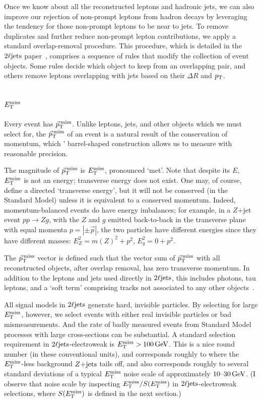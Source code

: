 Once we know about all the reconstructed leptons and hadronic jets, we can
also improve our rejection of non-prompt leptons from hadron decays by
leveraging the tendency for those non-prompt leptons to be near to jets.
To remove duplicates and further reduce non-prompt lepton contributions, we
apply a standard overlap-removal procedure.
This procedure, which is detailed in the $\twoljets$
paper~\cite{atlas2022searches},
comprises a sequence of rules that modify the collection of event objects.
Some rules decide which object to keep from an overlapping pair,
and others remove leptons overlapping with jets based on their $\Delta R$
and $\pt$.


\subsection{\texorpdfstring{$\met$}{ETmiss}}
Every event has $\ptmiss$.
Unlike leptons, jets, and other objects which we must select for, the $\ptmiss$
of an event is a natural result of the conservation of momentum, which \atlas'
barrel-shaped construction allows us to measure with reasonable precision.

The magnitude of $\ptmiss$ is $\met$, pronounced `met'.
Note that despite its $E$, $\met$ is not an energy; transverse energy does not exist.
One may, of course, define a directed `transverse energy', but it will
not be conserved (in the Standard Model) unless it is equivalent to a conserved
momentum.
Indeed, momentum-balanced events do have energy imbalances;
for example, in a $Z\mathrm{+jet}$ event $pp \to Zg$, with the $Z$ and
$g$ emitted back-to-back in the transverse plane with equal momenta
$p = |\pm \vec p|$, the two particles have different energies since they
have different masses: $E_Z^2 = m(Z)^2 + p^2$, $E_g^2 = 0 + p^2$.

The $\ptmiss$ vector is defined such that the vector sum of $\ptmiss$ with
all reconstructed objects, after overlap removal, has zero transverse momentum.
In addition to the leptons and jets used directly in $\twoljets$, this includes
photons, tau leptons, and a `soft term' comprising tracks not associated to
any other objects~\cite{atlas_met}.

All signal models in $\twoljets$ generate hard, invisible particles.
By selecting for large $\met$, however, we select events with either
real invisible particles or bad mismeasurements.
And the rate of badly measured events from Standard Model processes with large
cross-sections can be substantial.
A standard selection requirement in $\twoljets$-electroweak is
$\met > 100\,\eV[G]$.
This is a nice round number (in these conventional units), and corresponds
roughly to where the $\met$-less background $\zjets$ tails off,
and also corresponds roughly to several standard deviations of
a typical $\met$ noise scale of approximately $10\textrm{--}30\,\eV[G]$.
(I observe that noise scale by inspecting $\met / \metsig$ in
$\twoljets$-electroweak selections, where $\metsig$ is defined in the next
section.)


